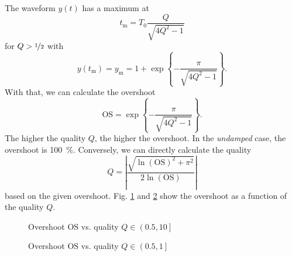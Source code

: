 \documentclass{article}[11pt]
\begin{document}
The waveform $y(t)$ has a maximum at 
\begin{equation}
t_{\mathrm{m}} = T_0 \frac{Q}{\sqrt{4Q^2-1}}
\end{equation}
for $Q > \nicefrac{1}{2}$ with
\begin{equation}
y(t_{\mathrm{m}}) =y_{\mathrm{m}} = 1 + \exp\left\{-\frac{\pi}{\sqrt{4Q^2-1}}\right\}.
\end{equation}
With that, we can calculate the overshoot
\begin{equation}
\mathrm{OS} =  \exp\left\{-\frac{\pi}{\sqrt{4Q^2-1}}\right\}.
\end{equation}
The higher the quality $Q$, the higher the overshoot.
In the \textit{undamped} case, the overshoot is \SI{100}{\percent}.
Conversely, we can directly calculate the quality 
\begin{equation}
Q = \left|\frac{\sqrt{\ln\left(\mathrm{OS}\right)^2+\pi^2}}{2\ln\left(\mathrm{OS}\right)}\right|
\end{equation}
based on the given overshoot.
Fig. \ref{fig:os1} and \ref{fig:os2} show the overshoot as 
a function of the quality $Q$.
\begin{figure}[H]
  \centering
  \caption{Overshoot $\mathrm{OS}$ vs. quality $Q\in\left(0.5,10\right]$}
  \label{fig:os1}
\end{figure}

\begin{figure}[H]
  \centering
  \caption{Overshoot $\mathrm{OS}$ vs. quality $Q\in\left(0.5,1\right]$}
  \label{fig:os2}
\end{figure}
\end{document}

